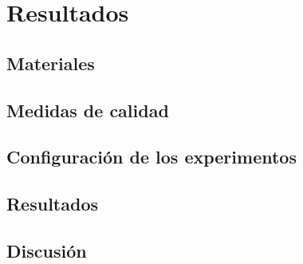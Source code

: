 
\chapter{Resultados} %

\label{Chapter4} %


\section{Materiales}


\section{Medidas de calidad}



\section{Configuraci\'on de los experimentos}


\section{Resultados}


\section{Discusi\'on}

